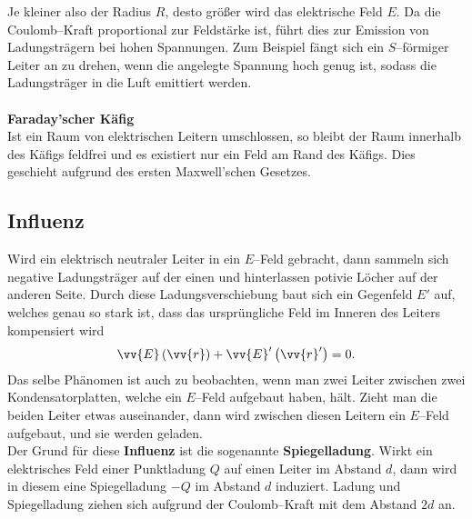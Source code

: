 \documentclass[a4paper,12pt]{article}
\begin{document}
Je kleiner also der Radius $R$, desto größer wird das elektrische Feld $E$. Da die Coulomb--Kraft proportional zur Feldstärke ist, führt dies zur Emission von Ladungsträgern bei hohen Spannungen. Zum Beispiel fängt sich ein $S$--förmiger Leiter an zu drehen, wenn die angelegte Spannung hoch genug ist, sodass die Ladungsträger in die Luft emittiert werden.
\\\hfill\\\textbf{Faraday'scher Käfig}\\ 
Ist ein Raum von elektrischen Leitern umschlossen, so bleibt der Raum innerhalb des Käfigs feldfrei und es existiert nur ein Feld am Rand des Käfigs. Dies geschieht aufgrund des ersten Maxwell'schen Gesetzes.

\subsection{Influenz}
Wird ein elektrisch neutraler Leiter in ein $E$--Feld gebracht, dann sammeln sich negative Ladungsträger auf der einen und hinterlassen potivie Löcher auf der anderen Seite. Durch diese Ladungsverschiebung baut sich ein Gegenfeld $E'$ auf, welches genau so stark ist, dass das ursprüngliche Feld im Inneren des Leiters kompensiert wird
\[ 
        \vv{E}\left(\vv{r}\right)+\vv{E}'\left(\vv{r}'\right)=0
.\] 
Das selbe Phänomen ist auch zu beobachten, wenn man zwei Leiter zwischen zwei Kondensatorplatten, welche ein $E$--Feld aufgebaut haben, hält. Zieht man die beiden Leiter etwas auseinander, dann wird zwischen diesen Leitern ein $E$--Feld aufgebaut, und sie werden geladen.\\\indent
Der Grund für diese \textbf{Influenz} ist die sogenannte \textbf{Spiegelladung}. Wirkt ein elektrisches Feld einer Punktladung $Q$ auf einen Leiter im Abstand $d$, dann wird in diesem eine Spiegelladung $-Q$ im Abstand $d$ induziert. Ladung und Spiegelladung ziehen sich aufgrund der Coulomb--Kraft mit dem Abstand $2d$ an.
\end{document}
